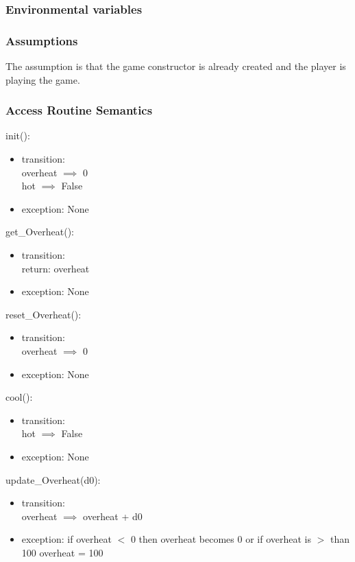 \documentclass[12pt, titlepage]{article}
\begin{document}
\subsubsection {Environmental variables}

\subsubsection {Assumptions}
The assumption is that the game constructor is already created and the player is playing the game.

\subsubsection {Access Routine Semantics}

\noindent init():
\begin{itemize}
\item transition:\\
overheat $\implies$ 0\\
hot $\implies$ False\\
\item exception: None
\end{itemize}

\noindent get\_Overheat():
\begin{itemize}
\item transition:\\
return: overheat\\
\item exception: None
\end{itemize}

\noindent reset\_Overheat():
\begin{itemize}
\item transition:\\
overheat $\implies$ 0\\
\item exception: None
\end{itemize}

\noindent cool():
\begin{itemize}
\item transition:\\
hot $\implies$ False\\
\item exception: None
\end{itemize}

\noindent update\_Overheat(d0):
\begin{itemize}
\item transition:\\
overheat $\implies$ overheat + d0
\item exception: if overheat $<$ 0 then overheat becomes 0 or if overheat is $>$ than 100 overheat = 100
\end{itemize}
\end{document}
